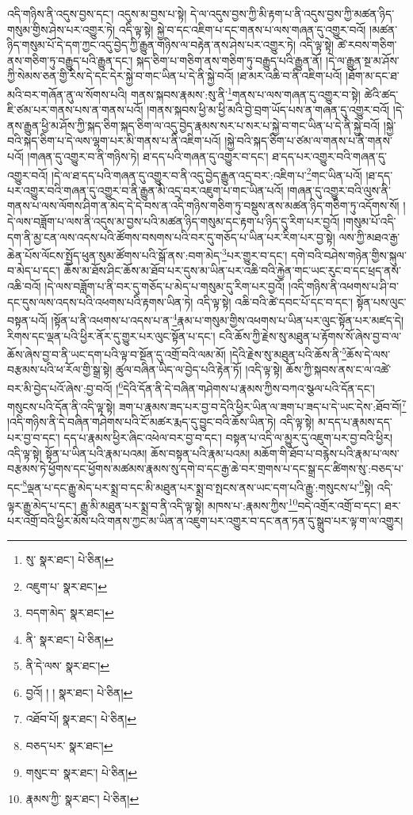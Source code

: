 འདི་གཉིས་ནི་འདུས་བྱས་དང་། འདུས་མ་བྱས་པ་སྟེ། དེ་ལ་འདུས་བྱས་ཀྱི་མི་རྟག་པ་ནི་འདུས་བྱས་ཀྱི་མཚན་ཉིད་གསུམ་གྱིས་ཤེས་པར་འགྱུར་ཏེ། འདི་ལྟ་སྟེ། སྐྱེ་བ་དང་འཇིག་པ་དང་གནས་པ་ལས་གཞན་དུ་འགྱུར་བའོ། །མཚན་ཉིད་གསུམ་པོ་དེ་དག་ཀྱང་འདུ་བྱེད་ཀྱི་རྒྱུན་གཉིས་ལ་བརྟེན་ནས་ཤེས་པར་འགྱུར་ཏེ། འདི་ལྟ་སྟེ། ཚེ་རབས་གཅིག་ནས་གཅིག་ཏུ་བརྒྱུད་པའི་རྒྱུན་དང་། སྐད་ཅིག་པ་གཅིག་ནས་གཅིག་ཏུ་བརྒྱུད་པའི་རྒྱུན་ནོ། །དེ་ལ་རྒྱུན་སྔ་མ་ཤོས་ཀྱི་སེམས་ཅན་གྱི་རིས་དེ་དང་དེར་སྐྱེ་བ་གང་ཡིན་པ་དེ་ནི་སྐྱེ་བའོ། །ཐ་མར་འཆི་བ་ནི་འཇིག་པའོ། །ཐོག་མ་དང་ཐ་མའི་བར་གཞོན་ནུ་ལ་སོགས་པའི། གནས་སྐབས་རྣམས་:སུ་ནི་\footnote{སུ་  སྣར་ཐང་།  པེ་ཅིན། }གནས་པ་ལས་གཞན་དུ་འགྱུར་བ་སྟེ། ཚེའི་ཚད་ཇི་ཙམ་པར་གནས་པས་ན་གནས་པའོ། །གནས་སྐབས་ཕྱི་མ་ཕྱི་མའི་བྱེ་བྲག་ཡོད་པས་ན་གཞན་དུ་འགྱུར་བའོ། །དེ་ནས་རྒྱུན་ཕྱི་མ་ཤོས་ཀྱི་སྐད་ཅིག་སྐད་ཅིག་ལ་འདུ་བྱེད་རྣམས་སར་པ་སར་པ་སྐྱེ་བ་གང་ཡིན་པ་དེ་ནི་སྐྱེ་བའོ། །སྐྱེ་བའི་སྐད་ཅིག་པ་དེ་ལས་ལྷག་པར་མི་གནས་པ་ནི་འཇིག་པའོ། །སྐྱེ་བའི་སྐད་ཅིག་པ་ཙམ་ལ་གནས་པ་ནི་གནས་པའོ། །གཞན་དུ་འགྱུར་བ་ནི་གཉིས་ཏེ། ཐ་དད་པའི་གཞན་དུ་འགྱུར་བ་དང་། ཐ་དད་པར་འགྱུར་བའི་གཞན་དུ་འགྱུར་བའོ། །དེ་ལ་ཐ་དད་པའི་གཞན་དུ་འགྱུར་བ་ནི་འདུ་བྱེད་རྒྱུན་འདྲ་བར་:འཇིག་པ་\footnote{འཇུག་པ་  སྣར་ཐང་། }གང་ཡིན་པའོ། །ཐ་དད་པར་འགྱུར་བའི་གཞན་དུ་འགྱུར་བ་ནི་རྒྱུན་མི་འདྲ་བར་འཇུག་པ་གང་ཡིན་པའོ། །གཞན་དུ་འགྱུར་བའི་ལུས་ནི་གནས་པ་ལས་ལོགས་ཤིག་ན་མེད་དེ་དེ་བས་ན་འདི་གཉིས་གཅིག་ཏུ་བསྡུས་ནས་མཚན་ཉིད་གཅིག་ཏུ་འདོགས་སོ། །དེ་ལས་བཟློག་པ་ལས་ནི་འདུས་མ་བྱས་པའི་མཚན་ཉིད་གསུམ་དང་རྟག་པ་ཉིད་དུ་རིག་པར་བྱའོ། །གསུམ་པོ་འདི་དག་ནི་མྱ་ངན་ལས་འདས་པའི་ཚོགས་བསགས་པའི་བར་དུ་གཅོད་པ་ཡིན་པར་རིག་པར་བྱ་སྟེ། ལས་ཀྱི་མཐའ་རྒྱ་ཆེན་པོས་ལོངས་སྤྱོད་ཕུན་སུམ་ཚོགས་པའི་སྒོ་ནས་:བག་མེད་\footnote{བདག་མེད་  སྣར་ཐང་། }པར་གྱུར་བ་དང་། དགེ་བའི་བཤེས་གཉེན་གྱིས་སྐུལ་བ་མེད་པ་དང་། ཆོས་མ་ཐོས་ཤིང་ཆོས་མ་ཐོབ་པར་དུས་མ་ཡིན་པར་འཆི་བའི་རྐྱེན་གང་ཡང་རུང་བ་དང་ཕྲད་ནས་འཆི་བའོ། །དེ་ལས་བཟློག་པ་ནི་བར་དུ་གཅོད་པ་མེད་པ་གསུམ་དུ་རིག་པར་བྱའོ། །འདི་གཉིས་ནི་འཕགས་པ་ཤི་བ་དང་དུས་ལས་འདས་པའི་འཕགས་པའི་རྟགས་ཡིན་ཏེ། འདི་ལྟ་སྟེ། འཆི་བའི་ཚེ་དབང་པོ་དང་བ་དང་། སྟོན་པས་ལུང་བསྟན་པའོ། །སྟོན་པ་ནི་འཕགས་པ་འདས་པ་ན་\footnote{ནི་  སྣར་ཐང་།  པེ་ཅིན། }རྣམ་པ་གསུམ་གྱིས་འཕགས་པ་ཡིན་པར་ལུང་སྟོན་པར་མཛད་དེ། རིགས་དང་ལྡན་པའི་ཕྱིར་ནོར་དུ་གྱུར་པར་ལུང་སྟོན་པ་དང་། ངའི་ཆོས་ཀྱི་རྗེས་སུ་མཐུན་པ་རྟོགས་སོ་ཞེས་བྱ་བ་ལ་ཆོས་ཞེས་བྱ་བ་ནི་ཡང་དག་པའི་ལྟ་བ་སྔོན་དུ་འགྲོ་བའི་ལམ་མོ། །དེའི་རྗེས་སུ་མཐུན་པའི་ཆོས་ནི་\footnote{ནི་དེ་ལས་  སྣར་ཐང་། }ཆོས་དེ་ལས་བརྩམས་པའི་ཕ་རོལ་གྱི་སྒྲ་སྟེ། ཚུལ་བཞིན་ཡིད་ལ་བྱེད་པའི་རྟེན་ཏོ། །འདི་ལྟ་སྟེ། ཆོས་ཀྱི་སྐབས་ནས་ང་ལ་འཚེ་བར་མི་བྱེད་པའོ་ཞེས་:བྱ་བའོ། །\footnote{བྱའོ། ། །  སྣར་ཐང་།  པེ་ཅིན། }དེའི་དོན་ནི་དེ་བཞིན་གཤེགས་པ་རྣམས་ཀྱིས་བཀའ་སྩལ་པའི་དོན་དང་། གསུངས་པའི་དོན་ནི་འདི་ལྟ་སྟེ། ཟག་པ་རྣམས་ཟད་པར་བྱ་བ་དེའི་ཕྱིར་ཡིན་ལ་ཟག་པ་ཟད་པ་དེ་ཡང་དེས་:ཐོབ་བོ།\footnote{འཐོབ་པོ།  སྣར་ཐང་།  པེ་ཅིན། } །འདི་གཉིས་ནི་དེ་བཞིན་གཤེགས་པའི་ངོ་མཚར་རྨད་དུ་བྱུང་བའི་ཆོས་ཡིན་ཏེ། འདི་ལྟ་སྟེ། མ་དད་པ་རྣམས་དད་པར་བྱ་བ་དང་། དད་པ་རྣམས་ཕྱིར་ཞིང་འཕེལ་བར་བྱ་བ་དང་། བསྟན་པ་འདི་ལ་མྱུར་དུ་འཇུག་པར་བྱ་བའི་ཕྱིར། འདི་ལྟ་སྟེ། སྟོན་པ་ཡིན་པའི་རྣམ་པའམ། ཆོས་བསྟན་པའི་རྣམ་པའམ། མཆོག་གི་ཐོབ་པ་བརྙེས་པའི་རྣམ་པ་ལས་བརྩམས་ཏེ་ཕྱོགས་དང་ཕྱོགས་མཚམས་རྣམས་སུ་དགེ་བ་དང་རྒྱ་ཆེ་བར་གྲགས་པ་དང་སྒྲ་དང་ཚིགས་སུ་:བཅད་པ་དང་\footnote{བཅད་པར་  སྣར་ཐང་། }ལྡན་པ་དང་རྒྱུ་མེད་པར་སྨྲ་བ་དང་མི་མཐུན་པར་སྨྲ་བ་སྤངས་ནས་ཡང་དག་པའི་རྒྱུ་:གསུངས་པ་\footnote{གསུང་བ་  སྣར་ཐང་།  པེ་ཅིན། }སྟེ། འདི་ལྟར་རྒྱུ་མེད་པ་དང་། རྒྱུ་མི་མཐུན་པར་སྨྲ་བ་ནི་འདི་ལྟ་སྟེ། མཁས་པ་:རྣམས་ཀྱིས་\footnote{རྣམས་ཀྱི་  སྣར་ཐང་།  པེ་ཅིན། }བདེ་འགྲོར་འགྲོ་བ་དང་། ཐར་པར་འགྲོ་བའི་ཕྱིར་མོས་པའི་གནས་ཀྱང་མ་ཡིན་ན་འཇུག་པར་འགྱུར་བ་དང་ནན་ཏན་དུ་སྒྲུབ་པར་ལྟ་ག་ལ་འགྱུར། 
